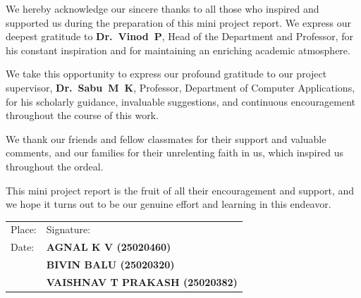 \documentclass[12pt,a4paper]{report}
\begin{document}
\vspace{0.35cm}
\noindent We hereby acknowledge our sincere thanks to all those who inspired and supported us during the preparation of this mini project report. We express our deepest gratitude to \mbox{\textbf{Dr.~Vinod~P}}, Head of the Department and Professor, for his constant inspiration and for maintaining an enriching academic atmosphere.

\vspace{0.35cm}
\noindent We take this opportunity to express our profound gratitude to our project supervisor, \mbox{\textbf{Dr.~Sabu~M~K}}, Professor, Department of Computer Applications, for his scholarly guidance, invaluable suggestions, and continuous encouragement throughout the course of this work.

\vspace{0.35cm}
\noindent We thank our friends and fellow classmates for their support and valuable comments, and our families for their unrelenting faith in us, which inspired us throughout the ordeal.

\vspace{0.35cm}
\noindent This mini project report is the fruit of all their encouragement and support, and we hope it turns out to be our genuine effort and learning in this endeavor.

\vfill

\noindent
\begin{tabular}{@{}p{}p{}@{}}
    Place: & Signature: \\[0.35cm]
    Date: & \textbf{AGNAL K V (25020460)} \\[0.25cm]
    & \textbf{BIVIN BALU (25020320)} \\[0.25cm]
    & \textbf{VAISHNAV T PRAKASH (25020382)} \\
\end{tabular}
\vspace*{0.8cm}

\newpage

\pagestyle{empty}
{\singlespacing
\tableofcontents
\newpage
\listoffigures
\newpage
\listoftables
\newpage
}
\end{document}
